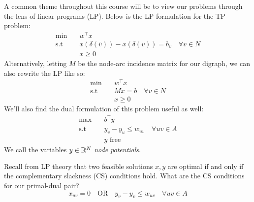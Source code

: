 A common theme throughout this course will be to view our problems through the lens of linear programs (LP). Below is the LP formulation for the TP problem:
\begin{equation}\label{eq:tp_lp-formulation}
\begin{aligned}
  \min \quad &w^\intercal x \\
  \text{s.t} \quad &x(\delta(\overline{v})) - x(\delta(v)) = b_v \quad \forall v \in N \\
  &x \geq 0
\end{aligned}
\end{equation}
Alternatively, letting $M$ be the node-arc incidence matrix for our digraph, we can also rewrite the LP like so:
\begin{align*}
  \min \quad &w^\intercal x \\
  \text{s.t} \quad &Mx = b \quad \forall v \in N \\
  &x \geq 0
\end{align*}
We'll also find the dual formulation of this problem useful as well:
\begin{equation}\label{eq:tp_dual-formulation}
\begin{aligned}
    \max \quad &b^\intercal y \\
    \text{s.t} \quad &y_v - y_u \leq w_{uv} \quad \forall uv \in A \\
    &y \text{ free}
\end{aligned}
\end{equation}
We call the variables $y \in \mathbb{R}^N$ \textit{node potentials}.

Recall from LP theory that two feasible solutions $x, y$ are optimal if and only if the complementary slackness (CS) conditions hold. What are the CS conditions for our primal-dual pair?
\begin{equation}
  x_{uv} = 0 \quad \text{OR} \quad y_v - y_v \leq w_{uv} \quad \forall uv \in A
\end{equation}

